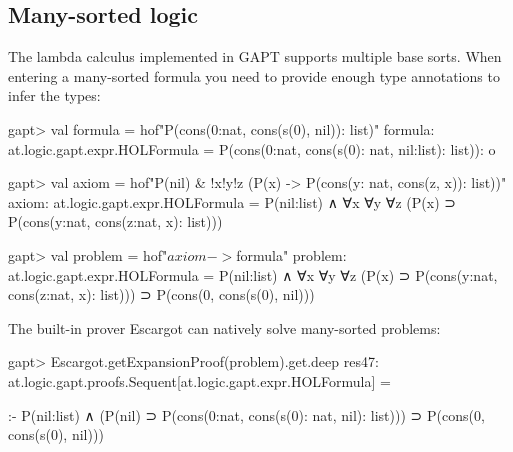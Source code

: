\documentclass[a4paper,11pt]{article}
\begin{document}
\subsection{Many-sorted logic}

The lambda calculus implemented in GAPT supports multiple base sorts.  When
entering a many-sorted formula you need to provide enough type annotations to
infer the types:
\begin{clilisting}
gapt> val formula = hof"P(cons(0:nat, cons(s(0), nil)): list)"
formula: at.logic.gapt.expr.HOLFormula = P(cons(0:nat, cons(s(0): nat, nil:list): list)): o

gapt> val axiom = hof"P(nil) & !x!y!z (P(x) -> P(cons(y: nat, cons(z, x)): list))"
axiom: at.logic.gapt.expr.HOLFormula = P(nil:list) ∧ ∀x ∀y ∀z (P(x) ⊃ P(cons(y:nat, cons(z:nat, x): list)))

gapt> val problem = hof"$axiom -> $formula"
problem: at.logic.gapt.expr.HOLFormula =
P(nil:list) ∧ ∀x ∀y ∀z (P(x) ⊃ P(cons(y:nat, cons(z:nat, x): list))) ⊃
  P(cons(0, cons(s(0), nil)))

\end{clilisting}

The built-in prover Escargot can natively solve many-sorted problems:
\begin{clilisting}
gapt> Escargot.getExpansionProof(problem).get.deep
res47: at.logic.gapt.proofs.Sequent[at.logic.gapt.expr.HOLFormula] =

:-
P(nil:list) ∧ (P(nil) ⊃ P(cons(0:nat, cons(s(0): nat, nil): list))) ⊃
  P(cons(0, cons(s(0), nil)))

\end{clilisting}
\end{document}
